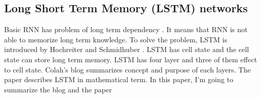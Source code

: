 \documentclass[12pt]{article}
\begin{document}
\subsection{Long Short Term Memory (LSTM) networks}
Basic RNN has problem of long term dependency \cite{UnderstandingLSTMNetworks}. It means that RNN is not able to memorize long term knowledge. To solve the problem, LSTM is introduced by Hochreiter and Schmidhuber \cite{hochreiter1997long}. LSTM has cell state and the cell state can store long term memory. LSTM has four layer and three of them effect to cell state. Colah's blog \cite{UnderstandingLSTMNetworks} summarizes concept and purpose of each layers. The paper \cite{zaremba2014recurrent} describes LSTM in mathematical term. In this paper, I'm going to summarize the blog \cite{UnderstandingLSTMNetworks} and the paper \cite{zaremba2014recurrent}
\end{document}
